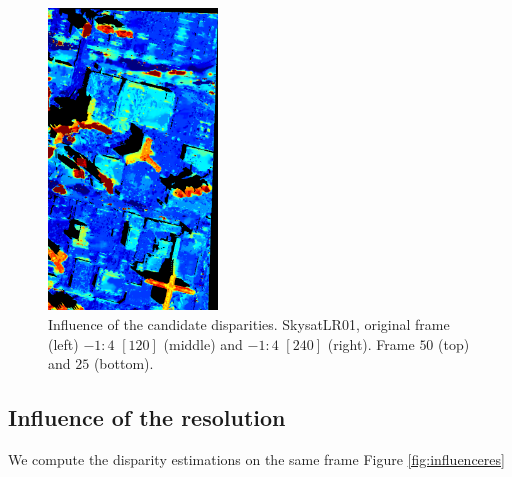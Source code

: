 \documentclass{article}
\theoremstyle{definition}
\begin{document}
\begin{figure}[ht]
 \includegraphics[height=8cm]{images/SkysatLR01_240/1521738847855_dmap_025.png}
 \caption{Influence of the candidate disparities. SkysatLR01, original frame (left) $-1:4$ $[120]$ (middle) and $-1:4$ $[240]$ (right). Frame $50$ (top) and $25$ (bottom).}
 \label{fig:skysatlr01:candidated}
\end{figure}


\subsection{Influence of the resolution}


We compute the disparity estimations on the same frame Figure \ref{fig:influenceres}
\end{document}
